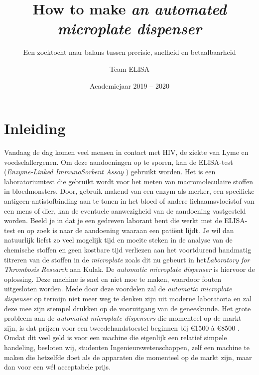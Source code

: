 \documentclass[a4paper,twoside,kulak]{kulakreport} %
\title{How to make \textit{an automated microplate dispenser}}
\subtitle{Een zoektocht naar balans tussen precisie, snelheid en betaalbaarheid}
\author{Team ELISA}
\institute{Matthias Derez, Maxime Dujardin, Korneel Verkens, Seppe Vilain}
\date{Academiejaar 2019 -- 2020}
\begin{document}
\sffamily
\titlepage

\tableofcontents

\chapter*{Inleiding}
Vandaag de dag komen veel mensen in contact met HIV, de ziekte van Lyme en voedselallergenen. Om deze aandoeningen op te sporen, kan de ELISA-test (\textit{Enzyme-Linked ImmunoSorbent Assay} \cite{website:wikipedia}) gebruikt worden. Het is een laboratoriumtest die gebruikt wordt voor het meten van macromoleculaire stoffen in bloedmonsters. Door, gebruik makend van een enzym als merker, een specifieke antigeen-antistofbinding aan te tonen in het bloed of andere lichaamsvloeistof van een mens of dier, kan de eventuele aanwezigheid van de aandoening vastgesteld worden. 
\newline
Beeld je in dat je een gedreven laborant bent die werkt met de ELISA-test en op zoek is naar de aandoening waaraan een patiënt lijdt. Je wil dan natuurlijk liefst zo veel mogelijk tijd en moeite steken in de analyse van de chemische stoffen en geen kostbare tijd verliezen aan het voortdurend handmatig titreren van de stoffen in de \textit{microplate} zoals dit nu gebeurt in het\textit{Laboratory for Thrombosis Research} aan Kulak. De \textit{automatic microplate dispenser} is hiervoor de oplossing. Deze machine is snel en niet moe te maken, waardoor fouten uitgesloten worden. Mede door deze voordelen zal de \textit{automatic microplate dispenser} op termijn niet meer weg te denken zijn uit moderne laboratoria en zal deze mee zijn stempel drukken op de vooruitgang van de geneeskunde. Het grote probleem aan de \textit{automated microplate dispensers} die momenteel op de markt zijn, is dat prijzen voor een tweedehandstoestel beginnen bij \euro 1500 à \euro 8500 \cite{website:LabX}. Omdat dit veel geld is voor een machine die eigenlijk een relatief simpele handeling, besloten wij, studenten Ingenieurswetenschappen, zelf een machine te maken die hetzelfde doet als de apparaten die momenteel op de markt zijn, maar dan voor een wél acceptabele prijs.
\end{document}
